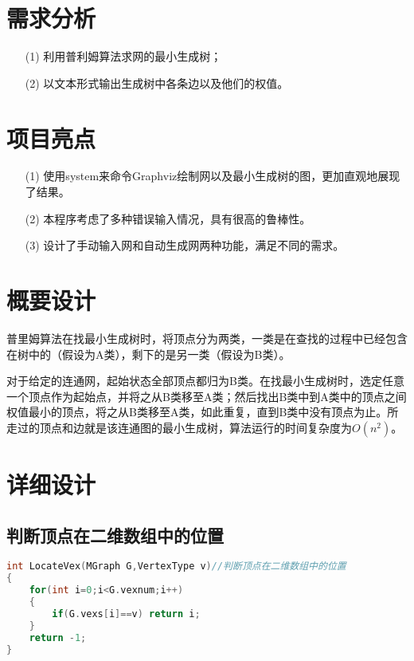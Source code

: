 \documentclass{DateStructure}
\begin{document}
\makecover
\newpage
\thispagestyle{empty}
\tableofcontents   
\newpage
\setcounter{page}{1}  

\section{需求分析}
\begin{itemize}
\item[(1)]利用普利姆算法求网的最小生成树；
\item[(2)]以文本形式输出生成树中各条边以及他们的权值。
\end{itemize}

\section{项目亮点}
\begin{itemize}
\item[(1)]使用system来命令Graphviz绘制网以及最小生成树的图，更加直观地展现了结果。
\item[(2)]本程序考虑了多种错误输入情况，具有很高的鲁棒性。
\item[(3)]设计了手动输入网和自动生成网两种功能，满足不同的需求。
\end{itemize}
\section{概要设计}
普里姆算法在找最小生成树时，将顶点分为两类，一类是在查找的过程中已经包含在树中的（假设为A类），剩下的是另一类（假设为B类）。\par
对于给定的连通网，起始状态全部顶点都归为B类。在找最小生成树时，选定任意一个顶点作为起始点，并将之从B类移至A类；然后找出B类中到A类中的顶点之间权值最小的顶点，将之从B类移至A类，如此重复，直到B类中没有顶点为止。所走过的顶点和边就是该连通图的最小生成树，算法运行的时间复杂度为$O(n^2)$。\par
\section{详细设计}
\subsection{判断顶点在二维数组中的位置}	
\begin{lstlisting}[language=c,caption={LocateVex}]
int LocateVex(MGraph G,VertexType v)//判断顶点在二维数组中的位置
{
    for(int i=0;i<G.vexnum;i++)
    {
        if(G.vexs[i]==v) return i;
    }
    return -1;
}
\end{lstlisting}
\end{document}
